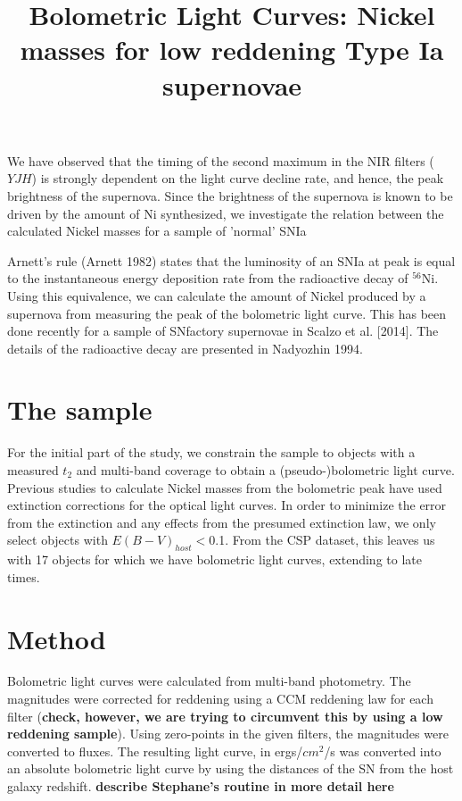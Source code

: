\documentclass{article}
\begin{document}
\title{Bolometric Light Curves: Nickel masses for low reddening Type Ia supernovae}
\maketitle
We have observed that the timing of the second maximum in the NIR filters ($YJH$) is strongly dependent on the light curve decline rate, and hence, the peak brightness of the supernova. Since the brightness of the supernova is known to be driven by the amount of Ni synthesized, we investigate the relation between the calculated Nickel masses for a sample of 'normal' SNIa

Arnett's rule (Arnett 1982) states that the luminosity of an SNIa at peak is equal to the instantaneous energy deposition rate from the radioactive decay of $^{56}$Ni. Using this equivalence, we can calculate the amount of Nickel produced by a supernova from measuring the peak of the bolometric light curve. This has been done recently for a sample of SNfactory supernovae in Scalzo et al. [2014]. The details of the radioactive decay are presented in Nadyozhin 1994. 





\section{The sample}
For the initial part of the study, we constrain the sample to objects with a measured $t_2$ and multi-band coverage to obtain a (pseudo-)bolometric light curve. Previous studies to calculate Nickel masses from the bolometric peak have used extinction corrections for the optical light curves. In order to minimize the error from the extinction and any effects from the presumed extinction law, we only select objects with $E(B-V)_{host}<$0.1. From the CSP dataset, this leaves us with 17 objects for which we have bolometric light curves, extending to late times.  


\section{Method}
Bolometric light curves were calculated from multi-band photometry. The magnitudes were corrected 
for reddening using a CCM reddening law for each filter ({\bf check, however, we are trying to 
circumvent this by using a low reddening sample}). 
Using zero-points in the given filters, the magnitudes were converted to fluxes. 
The resulting light curve, in ergs/$cm^2$/s  was converted into an absolute bolometric light curve 
by using the distances of the SN from the host galaxy redshift.  
{\bf describe Stephane's routine in more detail here}
\end{document}
